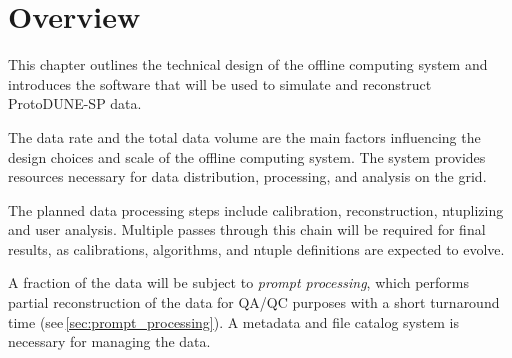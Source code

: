 \section{Overview}

This chapter outlines the technical design of the offline computing system and introduces the software
that will be used to simulate and reconstruct ProtoDUNE-SP data.

The data rate and the total data volume are the main factors influencing the design choices and scale of the offline computing system.   The system provides resources necessary for data distribution, processing, and analysis on the grid\cite{data_managm_sys}.  

The planned data processing steps include  
calibration, reconstruction, ntuplizing and user analysis.
Multiple passes through this chain will be required for final results, as
calibrations, algorithms, and ntuple definitions are expected to evolve.

A fraction of the data will be subject to \textit{prompt processing}, which performs partial reconstruction of the data for QA/QC purposes
with a short turnaround time (see\,\ref{sec:prompt_processing}). 
 A metadata and file catalog system is necessary for managing the data.
